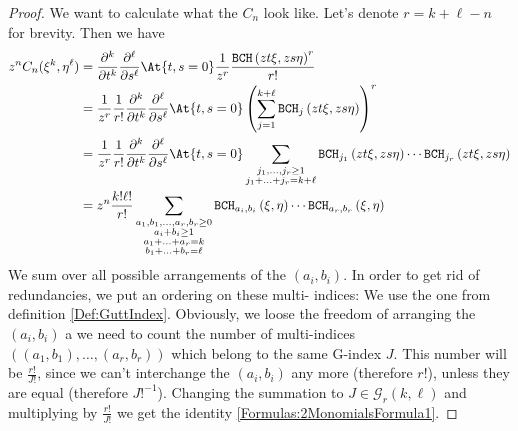 \begin{proof}
	We want to calculate what the $C_n$ look like. Let's denote $r = k 
	+ \ell - n$ for brevity. Then we have
    \begin{align}
        \nonumber
        z^n C_n(\xi^k, \eta^{\ell})
        & =
        \frac{\partial^k}{\partial t^k}
        \frac{\partial^{\ell}}{\partial s^{\ell}}
        \At{t,s = 0}
        \frac{1}{z^r}
        \frac{\bch{z t \xi}{z s \eta}^r    }{r!}
        \\
        \nonumber
        & =
        \frac{1}{z^r}
        \frac{1}{r!}
        \frac{\partial^k}{\partial t^k}
        \frac{\partial^{\ell}}{\partial s^{\ell}}
        \At{t,s = 0}
        \left(
            \sum\limits_{j = 1}^{k + \ell}
            \bchpart{j}{z t \xi}{z s \eta}
        \right)^r
        \\
        \nonumber
        & =
        \frac{1}{z^r}
        \frac{1}{r!}
        \frac{\partial^k}{\partial t^k}
        \frac{\partial^{\ell}}{\partial s^{\ell}}
        \At{t,s = 0}
        \sum\limits_{\substack{
        	j_1, \ldots, j_r \geq 1 \\
            j_1 + \ldots + j_r = k + \ell
        }}
        \bchpart{j_1}{z t \xi}{z s \eta} 
        \cdots
        \bchpart{j_r}{z t \xi}{z s \eta}
        \\
        \label{Formulas:2MonomialsExplicit}
        & =
        z^n
        \frac{k! \ell!}{r!}
        \sum\limits_{\substack{a_1, b_1, \ldots, a_r, b_r \geq 0 \\
            a_i + b_i \geq 1 \\
            a_1 + \ldots + a_r = k \\
            b_1 + \ldots + b_r = \ell
        }}
        \bchparts{a_i}{b_i}{\xi}{\eta}
        \cdots
        \bchparts{a_r}{b_r}{\xi}{\eta}
    \end{align}
    We sum over all possible arrangements of the $(a_i, b_i)$. In order 
    to get rid of redundancies, we put an ordering on these multi-
    indices: We use the one from definition \ref{Def:GuttIndex}. 
    Obviously, we loose the freedom of arranging the $(a_i, b_i)$ a we 
    need to count the number of multi-indices $((a_1, b_1), \ldots, 
    (a_r, b_r))$ which belong to the same G-index $J$. This number will 
    be $\frac{r!}{J!}$, since we can't interchange the $(a_i, b_i)$ any 
    more (therefore $r!$), unless they are equal (therefore $J!^{-1}$). 
    Changing the summation to $J \in \mathcal{G}_r(k, \ell)$ and 
    multiplying by $\frac{r!}{J!}$ we get the identity 
    \eqref{Formulas:2MonomialsFormula1}.
\end{proof}
